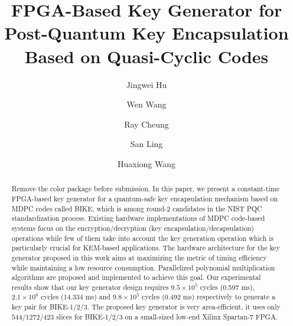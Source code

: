 \documentclass[runningheads]{llncs}
\begin{document}
%
\title{FPGA-Based Key Generator for Post-Quantum Key Encapsulation Based on Quasi-Cyclic Codes}
%
%
\author{Jingwei Hu \and Wen Wang \and Ray Cheung \and San Ling \and Huaxiong Wang}



%


%
\maketitle              %
%


\begin{abstract}
{\color{red} Remove the color package before submission.}
In this paper, we present a constant-time FPGA-based key generator for a
quantum-safe key encapsulation mechanism based on MDPC codes 
called BIKE, 
which is among round-2 candidates in the NIST PQC standardization process. 
Existing hardware implementations of MDPC code-based systems
focus on the encryption/decryption (key encapsulation/decapsulation) 
operations while few of them take into account
the key generation operation which is particularly crucial for
KEM-based applications. 
The hardware architecture for the key generator 
proposed in this work
aims at maximizing the metric of timing efficiency 
while maintaining a low resource consumption.
Parallelized polynomial multiplication algorithms are proposed 
and implemented to achieve this goal.
Our experimental results show that our key generator design
requires $9.5\times 10^5$ cycles (0.597 ms), 
$2.1\times 10^6$ cycles (14.334 ms) and $9.8\times 10^5$ cycles (0.492 ms) 
respectively
to generate a key pair for BIKE-1/2/3. 
The proposed key generator is very area-efficient, 
it uses only $544/1272/423$ slices for BIKE-1/2/3 on 
a small-sized low-end Xilinx Spartan-7 FPGA.

\end{abstract}
%
%
%
\end{document}
